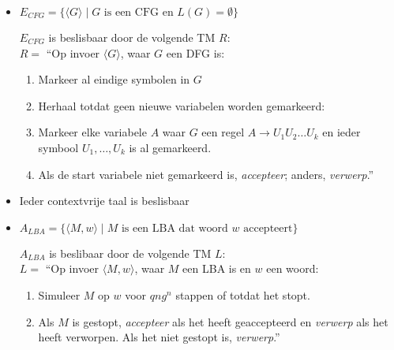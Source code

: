 \documentclass[]{article}
\begin{document}
\begin{itemize}
	
	\item $E_{CFG} = \{ \langle G \rangle \mid G \mbox{ is een CFG en } L(G) = \emptyset \} $
	
	$E_{CFG}$ is beslisbaar door de volgende TM $R$: \\
	$R = $ ``Op invoer $\langle G \rangle$, waar $G$ een DFG is:
	\begin{enumerate}
		\item Markeer al eindige symbolen in $G$
		\item Herhaal totdat geen nieuwe variabelen worden gemarkeerd:
		\item \hspace*{3mm} Markeer elke variabele $A$ waar $G$ een regel $A \rightarrow U_1U_2 \dots U_k$ en ieder symbool $U_1,\dots,U_k$ is al gemarkeerd.
		\item Als de start variabele niet gemarkeerd is, \emph{accepteer}; anders, \emph{verwerp}.''
	\end{enumerate}
	
	\item Ieder contextvrije taal is beslisbaar
	
	\item $A_{LBA} = \{ \langle M, w \rangle \mid M \mbox{ is een LBA dat woord $w$ accepteert} \}$
	
	$A_{LBA}$ is beslibaar door de volgende TM $L$: \\
	$L = $ ``Op invoer $\langle M, w \rangle$, waar $M$ een LBA is en $w$ een woord:
	\begin{enumerate}
		\item Simuleer $M$ op $w$ voor $qng^n$ stappen of totdat het stopt.
		\item Als $M$ is gestopt, \emph{accepteer} als het heeft geaccepteerd en \emph{verwerp} als het heeft verworpen. Als het niet gestopt is, \emph{verwerp}.''
	\end{enumerate}
\end{itemize}
\end{document}
